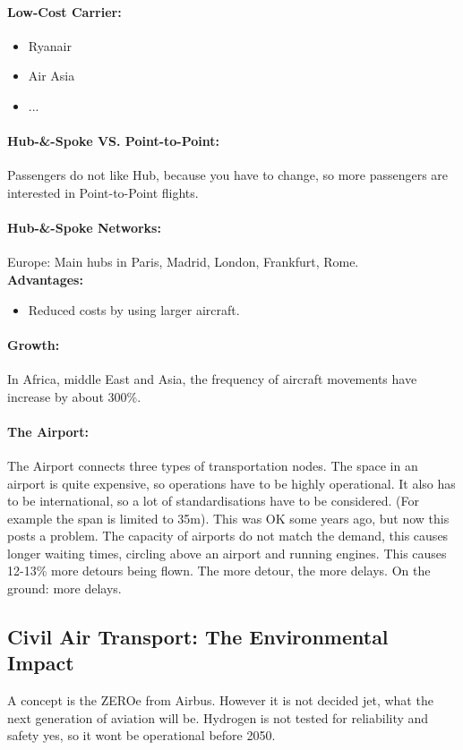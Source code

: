 \documentclass[twocolumn]{article}
\begin{document}
			\paragraph{Low-Cost Carrier:}
				\begin{itemize}
				\item Ryanair
				\item Air Asia
				\item ...
				\end{itemize}
				\paragraph{Hub-\&-Spoke VS. Point-to-Point:}
					Passengers do not like Hub, because you have to change, so more passengers are interested in Point-to-Point flights.
				\paragraph{Hub-\&-Spoke Networks:}
					Europe: Main hubs in Paris, Madrid, London, Frankfurt, Rome.\\
					\textbf{Advantages:}
					\begin{itemize}
					\item Reduced costs by using larger aircraft.
					\end{itemize}
				\paragraph{Growth:}
					In Africa, middle East and Asia, the frequency of aircraft movements have increase by about 300\%.
				\paragraph{The Airport:}
					The Airport connects three types of transportation nodes. The space in an airport is quite expensive, so operations have to be highly operational. It also has to be international, so a lot of standardisations have to be considered. (For example the span is limited to 35m). This was OK some years ago, but now this posts a problem. The capacity of airports do not match the demand, this causes longer waiting times, circling above an airport and running engines. This causes 12-13\% more detours being flown. The more detour, the more delays. On the ground: more delays.
		\subsection{Civil Air Transport: The Environmental Impact}
			A concept is the ZEROe from Airbus. However it is not decided jet, what the next generation of aviation will be. Hydrogen is not tested for reliability and safety yes, so it wont be operational before 2050.
\end{document}
